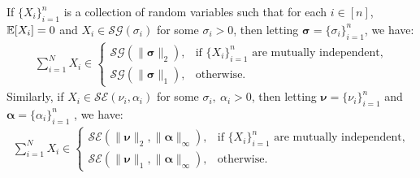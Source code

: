 \begin{lemma}\label{lemma:sum-sub-gaussian}
If $\{X_i\}_{i=1}^n$ is a collection of random variables such that for each $i \in [n]$, $\mathbb{E}[X_i] = 0$ and $X_i \in \mathcal{SG}(\sigma_i)$ for some $\sigma_i > 0$, then letting $\pmb{\sigma} = \{\sigma_i\}_{i=1}^n$, we have:
\begin{align*}
    \sum_{i=1}^N X_i \in 
    \begin{cases}
        \mathcal{SG}(\lVert \pmb{\sigma}\rVert_2), &\text{if $\{X_i\}_{i=1}^n$ are mutually independent,} \\
        \mathcal{SG}(\lVert \pmb{\sigma}\rVert_1), &\text{otherwise.}
    \end{cases}
\end{align*}
Similarly, if $X_i \in \mathcal{SE}(\nu_i, \alpha_i)$ for some $\sigma_i,\:\alpha_i > 0$, then letting $\pmb{\nu} = \{\nu_i\}_{i=1}^n$ and $\pmb{\alpha} = \{\alpha_i\}_{i=1}^n$ , we have:
\begin{align*}
    \sum_{i=1}^N X_i \in 
    \begin{cases}
        \mathcal{SE}(\lVert \pmb{\nu}\rVert_2, \lVert \pmb{\alpha}\rVert_\infty), &\text{if $\{X_i\}_{i=1}^n$ are mutually independent,} \\
        \mathcal{SE}(\lVert \pmb{\nu}\rVert_1,  \lVert \pmb{\alpha}\rVert_\infty), &\text{otherwise.}
    \end{cases}
\end{align*}
\end{lemma}

